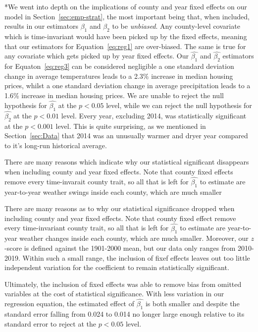 \documentclass[12pt,reqno]{amsart}
\theoremstyle{definition}
\begin{document}
    *We went into depth on the implications of county and year fixed effects on our model in Section~\ref{sec:emp-strat}, the most important being that, when included, results in our estimators $\beta_1$ and $\beta_2$ to be \textit{unbiased}. Any county-level covariate which is time-invariant \textemdash [examples] \textemdash would have been picked up by the fixed effects, meaning that our estimators for Equation~\ref{eq:reg1} are over-biased. The same is true for any covariate which gets picked up by year fixed effects. Our $\widehat{\beta_1}$ and $\widehat{\beta_2}$ estimators for Equaton~\ref{eq:reg3} can be considered negligible \textemdash a one standard deviation change in average temperatures leads to a 2.3\% increase in median housing prices, whilst a one standard deviation change in average precipitation leads to a 1.6\% increase in median housing prices. We are unable to reject the null hypothesis for $\widehat{\beta_1}$ at the $p<0.05$ level, while we can reject the null hypothesis for $\widehat{\beta_2}$ at the $p<0.01$ level. Every year, excluding 2014, was statistically significant at the $p<0.001$ level. This is quite surprising, as we mentioned in Section~\ref{sec:Data} that 2014 was an unusually warmer and dryer year compared to it's long-run historical average.

    There are many reasons which indicate why our statistical significant disappears when including county and year fixed effects. Note that county fixed effects remove every time-invarait county trait, so all that is left for $\widehat{\beta_1}$ to estimate are year-to-year weather swings inside each county, which are much smaller
    
    There are many reasons as to why our statistical significance dropped when including county and year fixed effects. Note that county fixed effect remove every time-invariant county trait, so all that is left for $\widehat{\beta_1}$ to estimate are year-to-year weather changes inside each county, which are much smaller. Moreover, our $z$-score is defined against the 1901-2000 mean, but our data only ranges from 2010-2019. Within such a small range, the inclusion of fixef effects leaves out too little independent variation for the coefficient to remain statistically significant. 
    
    Ultimately, the inclusion of fixed effects was able to remove bias from omitted variables at the cost of statistical significance. With less variation in our regression equation, the estimated effect of $\widehat{\beta_1}$ is both smaller and \textemdash despite the standard error falling from 0.024 to 0.014 \textemdash no longer large enough relative to its standard error to reject at the $p < 0.05$ level.
\newpage
\end{document}
